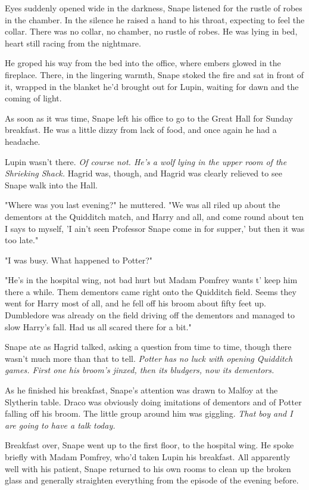 \documentclass[a4paper,11pt]{article}
\begin{document}
Eyes suddenly opened wide in the darkness, Snape listened for the rustle of robes in the chamber. In the silence he raised a hand to his throat, expecting to feel the collar. There was no collar, no chamber, no rustle of robes. He was lying in bed, heart still racing from the nightmare.

He groped his way from the bed into the office, where embers glowed in the fireplace. There, in the lingering warmth, Snape stoked the fire and sat in front of it, wrapped in the blanket he'd brought out for Lupin, waiting for dawn and the coming of light.

As soon as it was time, Snape left his office to go to the Great Hall for Sunday breakfast. He was a little dizzy from lack of food, and once again he had a headache.

Lupin wasn't there. \emph{Of course not. He's a wolf lying in the upper room of the Shrieking Shack.} Hagrid was, though, and Hagrid was clearly relieved to see Snape walk into the Hall.

"Where was you last evening?" he muttered. "We was all riled up about the dementors at the Quidditch match, and Harry and all, and come round about ten I says to myself, 'I ain't seen Professor Snape come in for supper,' but then it was too late."

"I was busy. What happened to Potter?"

"He's in the hospital wing, not bad hurt but Madam Pomfrey wants t' keep him there a while. Them dementors came right onto the Quidditch field. Seems they went for Harry most of all, and he fell off his broom about fifty feet up. Dumbledore was already on the field driving off the dementors and managed to slow Harry's fall. Had us all scared there for a bit."

Snape ate as Hagrid talked, asking a question from time to time, though there wasn't much more than that to tell. \emph{Potter has no luck with opening Quidditch games. First one his broom's jinxed, then its bludgers, now its dementors.}

As he finished his breakfast, Snape's attention was drawn to Malfoy at the Slytherin table. Draco was obviously doing imitations of dementors and of Potter falling off his broom. The little group around him was giggling. \emph{That boy and I are going to have a talk today.}

Breakfast over, Snape went up to the first floor, to the hospital wing. He spoke briefly with Madam Pomfrey, who'd taken Lupin his breakfast. All apparently well with his patient, Snape returned to his own rooms to clean up the broken glass and generally straighten everything from the episode of the evening before.
\end{document}
